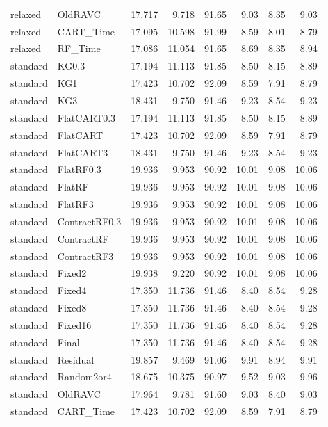 \begin{longtable}{@{}llrrrrrr@{}}
relaxed & OldRAVC & 17.717 & 9.718 & 91.65 & 9.03 & 8.35 & 9.03\\
relaxed & CART\_Time & 17.095 & 10.598 & 91.99 & 8.59 & 8.01 & 8.79\\
relaxed & RF\_Time & 17.086 & 11.054 & 91.65 & 8.69 & 8.35 & 8.94\\
standard & KG0.3 & 17.194 & 11.113 & 91.85 & 8.50 & 8.15 & 8.89\\
standard & KG1 & 17.423 & 10.702 & 92.09 & 8.59 & 7.91 & 8.79\\
standard & KG3 & 18.431 & 9.750 & 91.46 & 9.23 & 8.54 & 9.23\\
standard & FlatCART0.3 & 17.194 & 11.113 & 91.85 & 8.50 & 8.15 & 8.89\\
standard & FlatCART & 17.423 & 10.702 & 92.09 & 8.59 & 7.91 & 8.79\\
standard & FlatCART3 & 18.431 & 9.750 & 91.46 & 9.23 & 8.54 & 9.23\\
standard & FlatRF0.3 & 19.936 & 9.953 & 90.92 & 10.01 & 9.08 & 10.06\\
standard & FlatRF & 19.936 & 9.953 & 90.92 & 10.01 & 9.08 & 10.06\\
standard & FlatRF3 & 19.936 & 9.953 & 90.92 & 10.01 & 9.08 & 10.06\\
standard & ContractRF0.3 & 19.936 & 9.953 & 90.92 & 10.01 & 9.08 & 10.06\\
standard & ContractRF & 19.936 & 9.953 & 90.92 & 10.01 & 9.08 & 10.06\\
standard & ContractRF3 & 19.936 & 9.953 & 90.92 & 10.01 & 9.08 & 10.06\\
standard & Fixed2 & 19.938 & 9.220 & 90.92 & 10.01 & 9.08 & 10.06\\
standard & Fixed4 & 17.350 & 11.736 & 91.46 & 8.40 & 8.54 & 9.28\\
standard & Fixed8 & 17.350 & 11.736 & 91.46 & 8.40 & 8.54 & 9.28\\
standard & Fixed16 & 17.350 & 11.736 & 91.46 & 8.40 & 8.54 & 9.28\\
standard & Final & 17.350 & 11.736 & 91.46 & 8.40 & 8.54 & 9.28\\
standard & Residual & 19.857 & 9.469 & 91.06 & 9.91 & 8.94 & 9.91\\
standard & Random2or4 & 18.675 & 10.375 & 90.97 & 9.52 & 9.03 & 9.96\\
standard & OldRAVC & 17.964 & 9.781 & 91.60 & 9.03 & 8.40 & 9.03\\
standard & CART\_Time & 17.423 & 10.702 & 92.09 & 8.59 & 7.91 & 8.79\\

\end{longtable}
